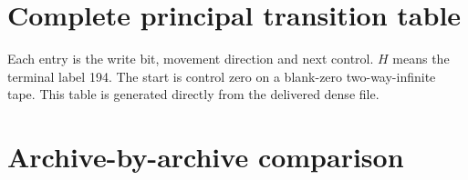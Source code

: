 \documentclass[11pt,letterpaper]{article}
\begin{document}
\appendix
\section{Complete principal transition table}\label{app:table}
Each entry is the write bit, movement direction and next control.
$H$ means the terminal label 194. The start is control zero on a
blank-zero two-way-infinite tape. This table is generated directly from
the delivered dense file.


\section{Archive-by-archive comparison}


\clearpage

\end{document}
